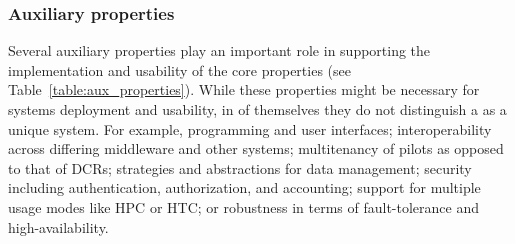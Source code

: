 \documentclass{sig-alternate}
\begin{document}
\begin{itemize}


\end{itemize}

\subsubsection{Auxiliary properties}
\label{sec:auxprops}

Several auxiliary properties play an important role in supporting the
implementation and usability of the core properties (see
Table~\ref{table:aux_properties}). While these properties might be necessary for
\pilot systems deployment and usability, in of themselves they do not
distinguish a \pilot as a unique system. For example, programming and user
interfaces; interoperability across differing middleware and other \pilot
systems; multitenancy of pilots as opposed to that of DCRs; strategies and
abstractions for data management; security including authentication,
authorization, and accounting; support for multiple usage modes like HPC or HTC;
or robustness in terms of fault-tolerance and high-availability.
\end{document}
